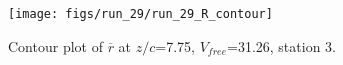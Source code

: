\begin{figure}[H]
\centering
\texttt{[image: figs/run\_29/run\_29\_R\_contour]}
\caption{Contour plot of $\overline{r}$ at $z/c$=7.75, $V_{free}$=31.26, station 3.}
\label{fig:run_29_R_contour}
\end{figure}


